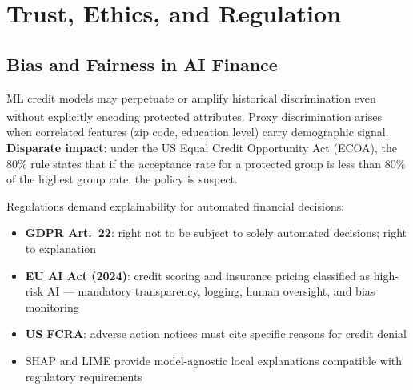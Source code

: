 \section{Trust, Ethics, and Regulation}

\subsection{Bias and Fairness in AI Finance}

\begin{tcbitemize}[ skin=sectionraster ]

    \tcbitem[title=Algorithmic Discrimination in Lending, raster multicolumn=3]
    ML credit models may perpetuate or amplify historical discrimination even without explicitly encoding protected attributes\textsuperscript{\cite[][p.~716]{jansenMachineLearningAlgorithmic2020}}.
    Proxy discrimination arises when correlated features (zip code, education level) carry demographic signal.
    \textbf{Disparate impact}: under the US Equal Credit Opportunity Act (ECOA), the 80\% rule states that if the acceptance rate for a protected group is less than 80\% of the highest group rate, the policy is suspect.

    \tcbitem[title=Explainability Requirements, raster multicolumn=3]
    Regulations demand explainability for automated financial decisions:
    \tcblower
    \begin{itemize}
        \item \textbf{GDPR Art.~22}: right not to be subject to solely automated decisions; right to explanation
        \item \textbf{EU AI Act (2024)}: credit scoring and insurance pricing classified as high-risk AI — mandatory transparency, logging, human oversight, and bias monitoring
        \item \textbf{US FCRA}: adverse action notices must cite specific reasons for credit denial
        \item SHAP and LIME provide model-agnostic local explanations compatible with regulatory requirements
    \end{itemize}

\end{tcbitemize}


